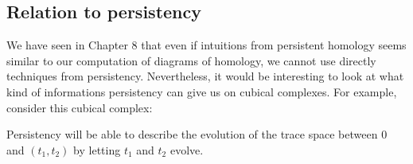 \subsection*{Relation to persistency}


We have seen in Chapter 8 that even if intuitions from persistent homology seems similar to our computation of diagrams of homology, we cannot use directly techniques from persistency. Nevertheless, it would be interesting to look at what kind of informations persistency can give us on cubical complexes. For example, consider this cubical complex:
\begin{figure}[H]
\centering
{}
\end{figure}
Persistency will be able to describe the evolution of the trace space between $0$ and $(t_1,t_2)$ by letting $t_1$ and $t_2$ evolve.
